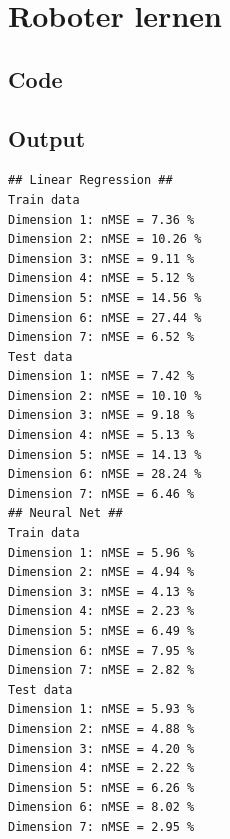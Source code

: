 \documentclass{article}
\begin{document}
\section{Roboter lernen}
\subsection{Code}


\subsection{Output}
\begin{lstlisting}
## Linear Regression ##
Train data
Dimension 1: nMSE = 7.36 %
Dimension 2: nMSE = 10.26 %
Dimension 3: nMSE = 9.11 %
Dimension 4: nMSE = 5.12 %
Dimension 5: nMSE = 14.56 %
Dimension 6: nMSE = 27.44 %
Dimension 7: nMSE = 6.52 %
Test data
Dimension 1: nMSE = 7.42 %
Dimension 2: nMSE = 10.10 %
Dimension 3: nMSE = 9.18 %
Dimension 4: nMSE = 5.13 %
Dimension 5: nMSE = 14.13 %
Dimension 6: nMSE = 28.24 %
Dimension 7: nMSE = 6.46 %
## Neural Net ##
Train data
Dimension 1: nMSE = 5.96 %
Dimension 2: nMSE = 4.94 %
Dimension 3: nMSE = 4.13 %
Dimension 4: nMSE = 2.23 %
Dimension 5: nMSE = 6.49 %
Dimension 6: nMSE = 7.95 %
Dimension 7: nMSE = 2.82 %
Test data
Dimension 1: nMSE = 5.93 %
Dimension 2: nMSE = 4.88 %
Dimension 3: nMSE = 4.20 %
Dimension 4: nMSE = 2.22 %
Dimension 5: nMSE = 6.26 %
Dimension 6: nMSE = 8.02 %
Dimension 7: nMSE = 2.95 %
\end{lstlisting}
\end{document}
